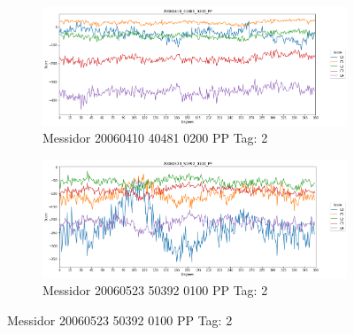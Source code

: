 \begin{figure}[ht!]
	\centering
	\begin{subfigure}[b]{ 0.85\textwidth}
		\centering
		\includegraphics[width=\textwidth]{Figures/chapter_stability/20060410_40481_0200_PP/r/scores.png}
		\caption{Messidor 20060410 40481 0200 PP Tag: 2}		
	\end{subfigure}
	\begin{subfigure}[b]{ 0.85\textwidth}
		\centering
		\includegraphics[width=\textwidth]{Figures/chapter_stability/20060523_50392_0100_PP/r/scores.png}
		\caption{Messidor 20060523 50392 0100 PP Tag: 2}		
	\end{subfigure}


\end{figure}
